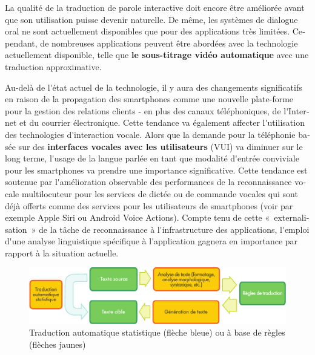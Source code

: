\begin{french}
\begin{multicols}{2}
La qualité de la traduction de parole interactive doit encore être
améliorée avant que son utilisation puisse devenir naturelle. De même,
les systèmes de dialogue oral ne sont actuellement disponibles que
pour des applications très limitées. Cependant, de nombreuses
applications peuvent être abordées avec la technologie actuellement
disponible, telle que {\bf le sous-titrage vidéo automatique} avec une
traduction approximative.

Au-delà de l{\mbox '}état actuel de la technologie, il y aura des
changements significatifs en raison de la propagation des smartphones
comme une nouvelle plate-forme pour la gestion des relations clients -
en plus des canaux téléphoniques, de l{\mbox '}Internet et du courrier
électronique. Cette tendance va également affecter l{\mbox
  '}utilisation des technologies d{\mbox '}interaction vocale. Alors
que la demande pour la téléphonie basée sur des {\bf interfaces
  vocales avec les utilisateurs} (VUI) va diminuer sur le long terme,
l{\mbox '}usage de la langue parlée en tant que modalité d{\mbox
  '}entrée conviviale pour les smartphones va prendre une importance
significative. Cette tendance est soutenue par l{\mbox '}amélioration
observable des performances de la reconnaissance vocale multilocuteur
pour les services de dictée ou de commande vocales qui sont déjà
offerts comme des services pour les utilisateurs de smartphones (voir
par exemple Apple Siri ou Android Voice Actions). Compte tenu de cette
«~externalisation~» de la tâche de reconnaissance à l{\mbox
  '}infrastructure des applications, l{\mbox '}emploi d{\mbox '}une
analyse linguistique spécifique à l{\mbox '}application gagnera en
importance par rapport à la situation actuelle.

\begin{figure}[t]
\begin{center}
 \includegraphics[width=\textwidth]{../_media/french/machine_translation}
\caption{Traduction automatique statistique (flèche bleue) ou à base de règles (flèches jaunes)}
\label{fig:mtarchi}
\end{center}
\end{figure}


\end{multicols}
\end{french}
